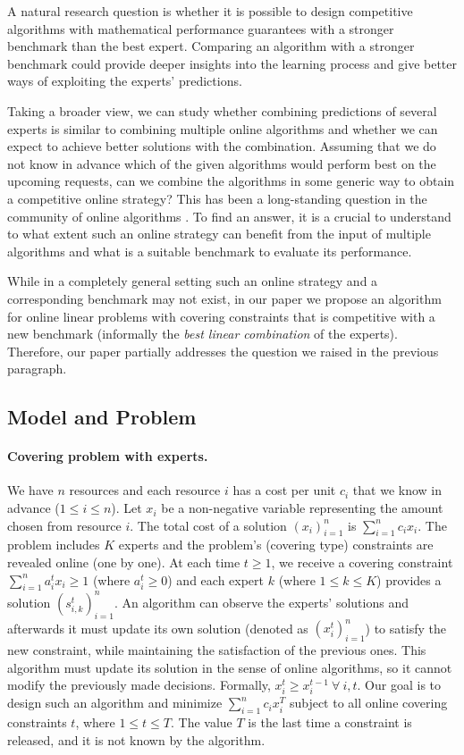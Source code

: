 A natural research question is whether it is possible to design competitive algorithms with mathematical performance guarantees with a stronger benchmark than the best expert. Comparing an algorithm with a stronger benchmark could provide deeper insights into the learning process and give better ways of exploiting the experts' predictions.

Taking a broader view, we can study whether combining predictions of several experts is similar to combining multiple online algorithms and whether we can expect to achieve better solutions with the combination. Assuming that we do not know in advance which of the given algorithms would perform best on the upcoming requests, can we combine the algorithms in some generic way to obtain a competitive online strategy? This has been a long-standing question in the community of online algorithms \cite{AzarBroder93:On-line-Choice,BlumBurch00:On-line-Learning}. To find an answer, it is a crucial to understand to what extent such an online strategy can benefit from the input of multiple algorithms and what is a suitable benchmark to evaluate its performance.

While in a completely general setting such an online strategy and a corresponding benchmark may not exist, in our paper we propose
an algorithm for online linear problems with covering constraints that is competitive with a new benchmark (informally the \emph{best linear combination} of the experts). Therefore, our paper partially addresses the question we raised in the previous paragraph.

\subsection{Model and Problem}

\paragraph{Covering problem with experts.}
We have $n$ resources and each resource $i$ has a cost per unit $c_{i}$ that we know in advance ($1 \leq i \leq n$).
Let $x_{i}$ be a non-negative variable representing the amount chosen from resource $i$.
The total cost of a solution $(x_{i})_{i=1}^{n}$ is $\sum_{i=1}^{n} c_{i} x_{i}$.
The problem includes $K$ experts and the problem's (covering type) constraints are revealed online (one by one).
At each time $t \geq 1$, we receive a covering constraint $\sum_{i=1}^{n} a_{i}^{t} x_{i} \geq 1$ (where $a_{i}^{t} \geq 0$) and each expert $k$ (where $1 \leq k \leq K$) provides
a solution $(s_{i,k}^{t})_{i=1}^{n}$. An algorithm can observe the experts' solutions and afterwards it must update its own solution (denoted as $(x_{i}^{t})_{i=1}^{n}$)
to satisfy the new constraint, while maintaining the satisfaction of the previous ones. This algorithm must update its solution in the sense of online algorithms, so it cannot modify the previously made decisions. Formally, $x_{i}^{t} \geq x_{i}^{t-1} ~\forall\ i, t$.
Our goal is to design such an algorithm and minimize $\sum_{i=1}^{n} c_{i} x_{i}^{T}$ subject to
all online covering constraints $t$, where $1 \leq t \leq T$. The value $T$ is the last time a constraint is released, and it is not known by the algorithm.


